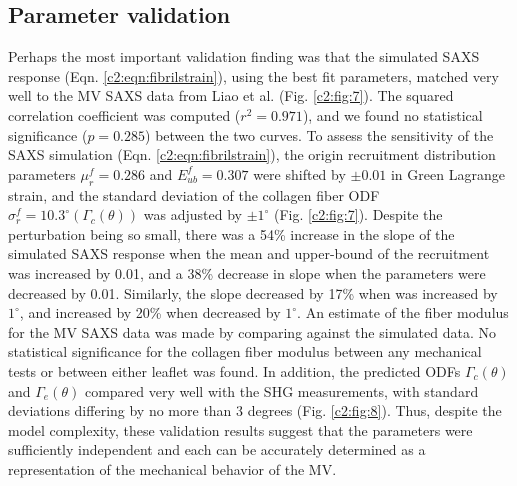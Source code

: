     


\subsection{Parameter validation} \label{c2:sec:233}

    Perhaps the most important validation finding was that the simulated SAXS response (Eqn. \ref{c2:eqn:fibrilstrain}), using the best fit parameters, matched very well to the MV SAXS data from Liao et al. \cite{liao_relation_2007} (Fig. \ref{c2:fig:7}). The squared correlation coefficient was computed ($r^2 = 0.971$), and we found no statistical significance ($p = 0.285$) between the two curves. To assess the sensitivity of the SAXS simulation (Eqn. \ref{c2:eqn:fibrilstrain}), the origin recruitment distribution parameters $\mu_r^f = 0.286$ and $E_{ub}^f = 0.307 $ were shifted by $\pm0.01$ in Green Lagrange strain, and the standard deviation of the collagen fiber ODF $\sigma_r^f = 10.3^\circ (\Gamma_c(\theta))$ was adjusted by $\pm1^\circ$ (Fig. \ref{c2:fig:7}). Despite the perturbation being so small, there was a 54\% increase in the slope of the simulated SAXS response when the mean and upper-bound of the recruitment was increased by 0.01, and a 38\% decrease in slope when the parameters were decreased by 0.01. Similarly, the slope decreased by 17\% when was increased by $1^\circ$, and increased by 20\% when decreased by $1^\circ$. 
    An estimate of the fiber modulus for the MV SAXS data was made by comparing against the simulated data. No statistical significance for the collagen fiber modulus between any mechanical tests or between either leaflet was found. In addition, the predicted ODFs $\Gamma_c(\theta)$ and $\Gamma_e(\theta)$ compared very well with the SHG measurements, with standard deviations differing by no more than 3 degrees (Fig. \ref{c2:fig:8}). Thus, despite the model complexity, these validation results suggest that the parameters were sufficiently independent and each can be accurately determined as a representation of the mechanical behavior of the MV.
    
